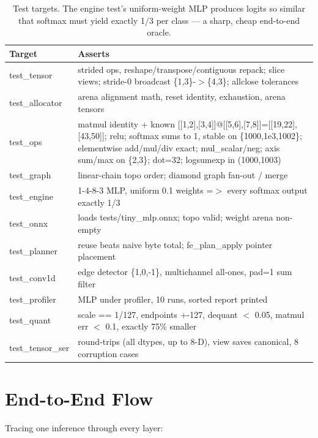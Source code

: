 \documentclass[11pt,a4paper]{article}
\begin{document}
\begin{table}[h]
\centering
\small
\begin{tabularx}{\textwidth}{@{}l X@{}}
\toprule
\textbf{Target} & \textbf{Asserts} \\
\midrule
test\_tensor & strided ops, reshape/transpose/contiguous repack; slice views; stride-0 broadcast \{1,3\}-$>$\{4,3\}; allclose tolerances\\
test\_allocator & arena alignment math, reset identity, exhaustion, arena tensors\\
test\_ops & matmul identity + known [[1,2],[3,4]]@[[5,6],[7,8]]=[[19,22],[43,50]]; relu; softmax sums to 1, stable on \{1000,1e3,1002\}; elementwise add/mul/div exact; mul\_scalar/neg; axis sum/max on \{2,3\}; dot=32; logsumexp in (1000,1003)\\
test\_graph & linear-chain topo order; diamond graph fan-out / merge\\
test\_engine & 1-4-8-3 MLP, uniform 0.1 weights =$>$ every softmax output exactly 1/3\\
test\_onnx & loads tests/tiny\_mlp.onnx; topo valid; weight arena non-empty\\
test\_planner & reuse beats naive byte total; fe\_plan\_apply pointer placement\\
test\_conv1d & edge detector \{1,0,-1\}, multichannel all-ones, pad=1 sum filter\\
test\_profiler & MLP under profiler, 10 runs, sorted report printed\\
test\_quant & scale == 1/127, endpoints +-127, dequant $<$ 0.05, matmul err $<$ 0.1, exactly 75\% smaller\\
test\_tensor\_ser & round-trips (all dtypes, up to 8-D), view saves canonical, 8 corruption cases\\
\bottomrule
\end{tabularx}
\caption{Test targets. The engine test's uniform-weight MLP produces logits so
similar that softmax must yield exactly 1/3 per class --- a sharp, cheap
end-to-end oracle.}
\end{table}

\section{End-to-End Flow}

Tracing one inference through every layer:
\end{document}
